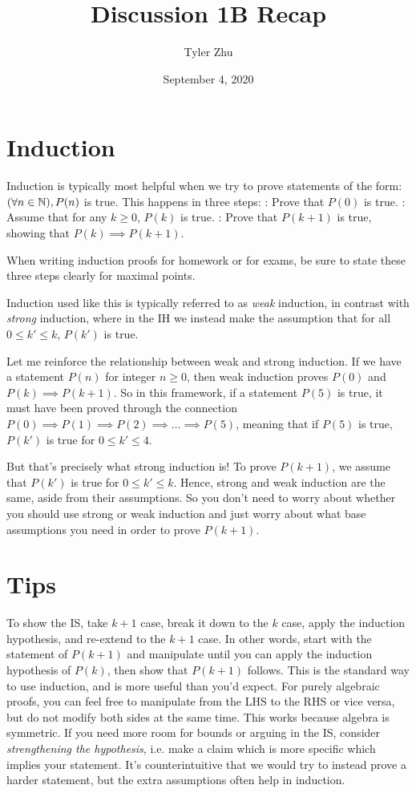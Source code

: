 \documentclass[11 pt]{scrartcl}
\newcommand{\hwtitle}{Discussion 1B Recap}
\begin{document}
 
\title{\Large \hwtitle{}}
\author{\large Tyler Zhu}
\date{\large September 4, 2020}

\maketitle 

\section{Induction}

Induction is typically most helpful when we try to prove statements of the form: $(\forall n\in \mathbb N), P(n)$ is true. This happens in three steps:
\itemnum
    \ii {}: Prove that $P(0)$ is true.
    \ii {}: Assume that for any $k \geq 0$, $P(k)$ is true. 
    \ii {}: Prove that $P(k+1)$ is true, showing that $P(k) \implies P(k+1)$. 
\itemend

When writing induction proofs for homework or for exams, be sure to state these three steps clearly for maximal points. 

Induction used like this is typically referred to as \emph{weak} induction, in contrast with \emph{strong} induction, where in the IH we instead make the assumption that for all $0\leq k' \leq k$, $P(k')$ is true.  

Let me reinforce the relationship between weak and strong induction. If we have a statement $P(n)$ for integer $n \geq 0$, then weak induction proves $P(0)$ and $P(k) \implies P(k+1)$. So in this framework, if a statement $P(5)$ is true, it must have been proved through the connection $P(0) \implies P(1) \implies P(2) \implies \dots \implies P(5)$, meaning that if $P(5)$ is true, $P(k')$ is true for $0\leq k' \leq 4$.

But that's precisely what strong induction is! To prove $P(k+1)$, we assume that $P(k')$ is true for $0 \leq k' \leq k$. Hence, strong and weak induction are the same, aside from their assumptions. So you don't need to worry about whether you should use strong or weak induction and just worry about what base assumptions you need in order to prove $P(k+1)$. 

\section{Tips}
\itemnum
    \ii To show the IS, take $k+1$ case, break it down to the $k$ case, apply the induction hypothesis, and re-extend to the $k+1$ case. In other words, start with the statement of $P(k+1)$ and manipulate until you can apply the induction hypothesis of $P(k)$, then show that $P(k+1)$ follows. This is the standard way to use induction, and is more useful than you'd expect.  
    \ii For purely algebraic proofs, you can feel free to manipulate from the LHS to the RHS or vice versa, but do not modify both sides at the same time. This works because algebra is symmetric. 
    \ii If you need more room for bounds or arguing in the IS, consider \emph{strengthening the hypothesis}, i.e. make a claim which is more specific which implies your statement. It's counterintuitive that we would try to instead prove a harder statement, but the extra assumptions often help in induction. 
\itemend
\end{document}
